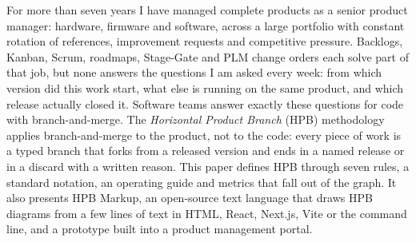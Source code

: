For more than seven years I have managed complete products as a senior
product manager: hardware, firmware and software, across a large portfolio
with constant rotation of references, improvement requests and competitive
pressure. Backlogs, Kanban, Scrum, roadmaps, Stage-Gate and PLM change
orders each solve part of that job, but none answers the questions I am
asked every week: from which version did this work start, what else is
running on the same product, and which release actually closed it.
Software teams answer exactly these questions for code with
branch-and-merge. The \emph{Horizontal Product Branch} (HPB) methodology
applies branch-and-merge to the product, not to the code: every piece of
work is a typed branch that forks from a released version and ends in a
named release or in a discard with a written reason. This paper defines
HPB through seven rules, a standard notation, an operating guide and
metrics that fall out of the graph. It also presents HPB Markup, an
open-source text language that draws HPB diagrams from a few lines of text
in HTML, React, Next.js, Vite or the command line, and a prototype built
into a product management portal.
